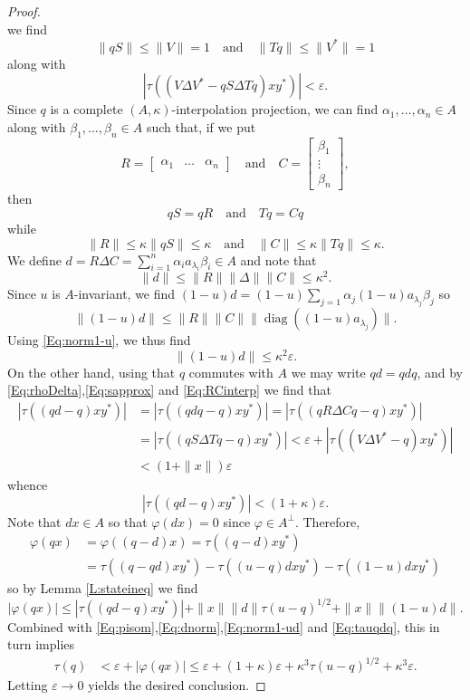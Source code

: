 \documentclass[10pt]{amsart}
\newcommand{\eps}{\varepsilon}
\renewcommand{\phi}{\varphi}
\newcommand{\qand}{\quad\text{and}\quad}
\newcommand{\diag}{\operatorname{diag}}
\theoremstyle{definition}
\begin{document}
\begin{proof}
\[ \]
 we find 
 \[
 \|qS\|\leq \|V\|=1 \qand \|Tq\|\leq \|V^*\|=1
 \]
 along with
 \begin{equation}\label{Eq:sapprox}
 \left| \tau\left(( V \Delta V^*-qS\Delta Tq)xy^*\right)\right|<\eps.
 \end{equation}
 Since $q$ is a complete $(A,\kappa)$-interpolation projection, we can find $\alpha_1,\ldots,\alpha_n\in A$ along with $\beta_1,\ldots,\beta_n\in A$ such that, if we put
 \[
  R=\begin{bmatrix}\alpha_1& \ldots &\alpha_n \end{bmatrix} \qand C=\begin{bmatrix}\beta_1\\ \vdots \\ \beta_n \end{bmatrix},
 \]
 then 
 \begin{equation}\label{Eq:RCinterp}
 qS=qR \qand Tq=Cq
 \end{equation}
 while
 \[
 \|R\|\leq\kappa\|qS\|\leq\kappa \qand \|C\|\leq \kappa \|Tq\|\leq\kappa.
 \]
 We  define $d=R\Delta C=\sum_{i=1}^n \alpha_i a_{\lambda_i} \beta_i \in A$ and note that
 \begin{equation}\label{Eq:dnorm}
 \|d\|\leq \|R\| \|\Delta\| \|C\|\leq  \kappa^2.
 \end{equation} 
Since $u$ is $A$-invariant, we find $(1-u)d=(1-u)\sum_{j=1} \alpha_j (1-u)a_{\lambda_j} \beta_j$ so
\[
 \|(1-u)d\|\leq \|R\| \|C\| \|\diag((1-u)a_{\lambda_j})\|.
\]
Using \eqref{Eq:norm1-u}, we thus find
\begin{equation}\label{Eq:norm1-ud}
  \|(1-u)d\|\leq \kappa^2 \eps.
\end{equation}
On the other hand, using that $q$ commutes with $A$ we may write $qd=qdq$, and by \eqref{Eq:rhoDelta},\eqref{Eq:sapprox} and \eqref{Eq:RCinterp} we find that
\begin{align*}
|\tau( (qd-q)xy^*)|&=|\tau((qdq-q)xy^*)|=|\tau((qR\Delta Cq-q)xy^*)|\\
 &=|\tau((qS\Delta Tq-q)xy^*)|< \eps+|\tau((V\Delta V^*-q)xy^*)|\\
 &< (1+\|x\|)\eps
\end{align*}
whence
\begin{equation}\label{Eq:tauqdq}
|\tau( (qd-q)xy^*)|<(1+\kappa)\eps.
\end{equation}
Note that $dx\in A$ so that $\phi(dx)=0$ since $\phi\in A^\perp$. Therefore,
\begin{align*}
\phi(qx)&=\phi((q-d)x)=\tau((q-d)xy^*)\\
 &=\tau((q-qd)xy^*)-\tau((u-q)dxy^*)-\tau((1-u)dxy^*)
\end{align*}
so by Lemma \ref{L:stateineq} we find
\[
|\phi(qx)|\leq|\tau((qd-q)xy^*)|+ \|x\| \|d\| \tau(u-q)^{1/2}+\|x\|\|(1-u)d\|.
\]
Combined with \eqref{Eq:pisom},\eqref{Eq:dnorm},\eqref{Eq:norm1-ud} and \eqref{Eq:tauqdq}, this in turn implies
\begin{align*}
 \tau(q)&<\eps+|\phi(qx)|\leq \eps+ (1+\kappa)\eps+\kappa^3 \tau(u-q)^{1/2}+\kappa^3\eps.
\end{align*}
 Letting $\eps\to 0$ yields the desired conclusion.
 \end{proof}
 
\end{document}
